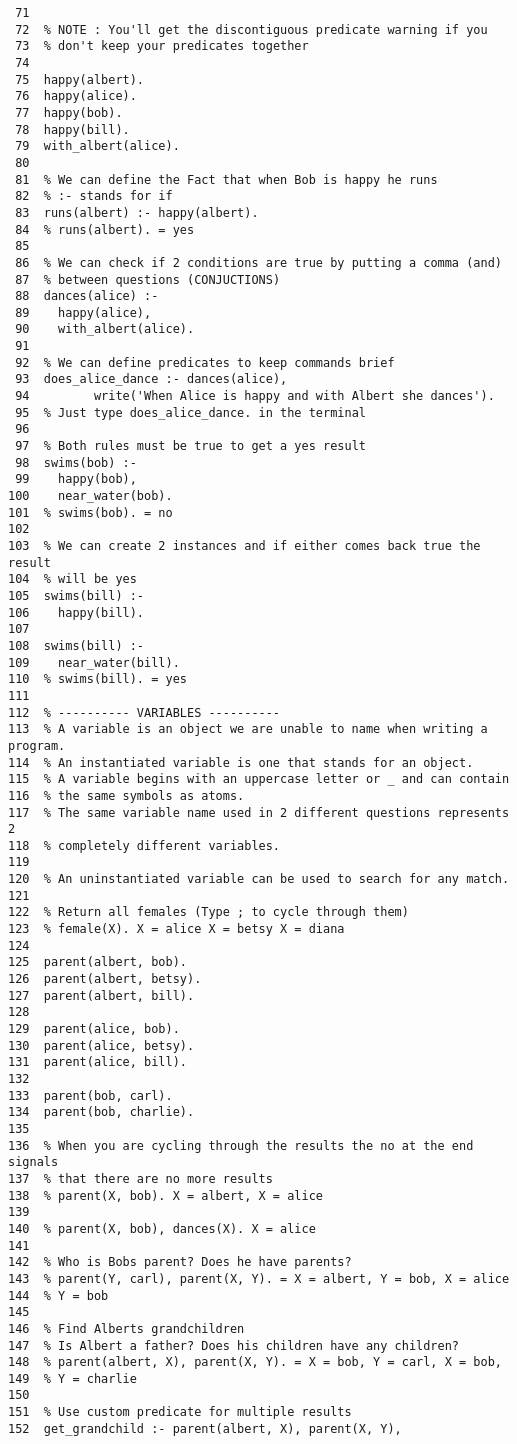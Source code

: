 \documentclass[11pt]{article}
\begin{document}
\begin{verbatim}
 71  
 72  % NOTE : You'll get the discontiguous predicate warning if you
 73  % don't keep your predicates together
 74  
 75  happy(albert).
 76  happy(alice).
 77  happy(bob).
 78  happy(bill).
 79  with_albert(alice).
 80  
 81  % We can define the Fact that when Bob is happy he runs
 82  % :- stands for if
 83  runs(albert) :- happy(albert).
 84  % runs(albert). = yes
 85  
 86  % We can check if 2 conditions are true by putting a comma (and)
 87  % between questions (CONJUCTIONS)
 88  dances(alice) :-
 89    happy(alice),
 90    with_albert(alice).
 91  
 92  % We can define predicates to keep commands brief
 93  does_alice_dance :- dances(alice),
 94         write('When Alice is happy and with Albert she dances').
 95  % Just type does_alice_dance. in the terminal
 96  
 97  % Both rules must be true to get a yes result
 98  swims(bob) :-
 99    happy(bob),
100    near_water(bob).
101  % swims(bob). = no
102  
103  % We can create 2 instances and if either comes back true the result
104  % will be yes
105  swims(bill) :-
106    happy(bill).
107  
108  swims(bill) :-
109    near_water(bill).
110  % swims(bill). = yes
111  
112  % ---------- VARIABLES ----------
113  % A variable is an object we are unable to name when writing a program.
114  % An instantiated variable is one that stands for an object.
115  % A variable begins with an uppercase letter or _ and can contain
116  % the same symbols as atoms.
117  % The same variable name used in 2 different questions represents 2
118  % completely different variables.
119  
120  % An uninstantiated variable can be used to search for any match.
121  
122  % Return all females (Type ; to cycle through them)
123  % female(X). X = alice X = betsy X = diana
124  
125  parent(albert, bob).
126  parent(albert, betsy).
127  parent(albert, bill).
128  
129  parent(alice, bob).
130  parent(alice, betsy).
131  parent(alice, bill).
132  
133  parent(bob, carl).
134  parent(bob, charlie).
135  
136  % When you are cycling through the results the no at the end signals
137  % that there are no more results
138  % parent(X, bob). X = albert, X = alice
139  
140  % parent(X, bob), dances(X). X = alice
141  
142  % Who is Bobs parent? Does he have parents?
143  % parent(Y, carl), parent(X, Y). = X = albert, Y = bob, X = alice
144  % Y = bob
145  
146  % Find Alberts grandchildren
147  % Is Albert a father? Does his children have any children?
148  % parent(albert, X), parent(X, Y). = X = bob, Y = carl, X = bob,
149  % Y = charlie
150  
151  % Use custom predicate for multiple results
152  get_grandchild :- parent(albert, X), parent(X, Y),

\end{verbatim}
\end{document}
